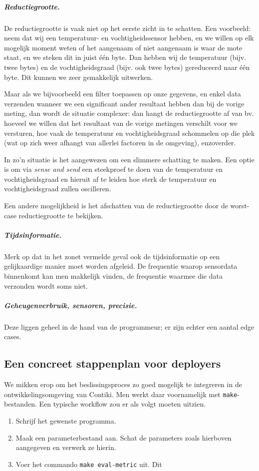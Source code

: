 \documentclass{article}
\begin{document}
\subparagraph{Reductiegrootte.} De reductiegrootte is vaak
niet op het eerste zicht in te schatten. Een voorbeeld: neem dat wij een
temperatuur- en vochtigheidssensor hebben, en we willen op elk mogelijk moment
weten of het aangenaam of niet aangenaam is waar de mote staat, en we steken dit
in juist één byte. Dan hebben wij de temperatuur (bijv. twee bytes) en de
vochtigheidsgraad (bijv. ook twee bytes) gereduceerd naar \'e\'en byte. Dit
kunnen we zeer gemakkelijk uitwerken.

Maar als we bijvoorbeeld een filter toepassen op onze gegevens, en enkel data
verzenden wanneer we een significant ander resultaat hebben dan bij de vorige
meting, dan wordt de situatie complexer: dan hangt de reductiegrootte af van
bv. hoeveel we willen dat het resultaat van de vorige metingen verschilt voor we
versturen, hoe vaak de temperatuur en vochtigheidsgraad schommelen op die plek
(wat op zich weer afhangt van allerlei factoren in de omgeving), enzoverder.

In zo'n situatie is het aangewezen om een slimmere schatting te maken. Een optie
is om via \textit{sense and send} een steekproef te doen van de temperatuur en
vochtigheidsgraad en hieruit af te leiden hoe sterk de temperatuur en
vochtigheidsgraad zullen oscilleren.

Een andere mogelijkheid is het afschatten van de reductiegrootte door de
worst-case reductiegrootte te bekijken. 

\subparagraph{Tijdsinformatie.} Merk op dat in het zonet vermelde geval ook de
tijdsinformatie op een gelijkaardige manier moet worden afgeleid. De frequentie
waarop sensordata binnenkomt kan men makkelijk vinden, de frequentie waarmee die
data verzonden wordt soms niet. 

\subparagraph{Geheugenverbruik, sensoren, precisie.} Deze liggen geheel in de
hand van de programmeur; er zijn echter een aantal edge cases. 

\subsection{Een concreet stappenplan voor deployers}
We mikken erop om het beslissingsproces zo goed mogelijk te integreren in
de ontwikkelingsomgeving van Contiki. Men werkt daar voornamelijk met
\texttt{make}-bestanden. Een typische workflow zou er als volgt moeten uitzien.

\begin{enumerate}
\item Schrijf het gewenste programma.
\item Maak een parameterbestand aan. Schat de parameters zoals hierboven
aangegeven en verwerk ze hierin.
\item Voer het commando \texttt{make eval-metric} uit. Dit 
\end{enumerate}
\end{document}
